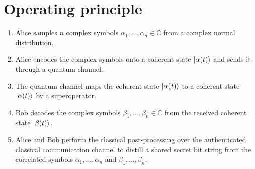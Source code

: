 \section{Operating principle}

\begin{enumerate}
	\item Alice samples $n$ complex symbols $\alpha_1,\dots,\alpha_n\in\mathbb{C}$ from a complex normal distribution.
	\item Alice encodes the complex symbols onto a coherent state $\ket{\alpha(t)}$ and sends it through a quantum channel.
	\item The quantum channel maps the coherent state $\ket{\alpha(t)}$ to a coherent state $\ket{\alpha(t)}$ by a superoperator.
	\item Bob decodes the complex symbols $\beta_1,\dots,\beta_n\in\mathbb{C}$ from the received coherent state $\ket{\beta(t)}$.
	\item Alice and Bob perform the classical post-processing over the authenticated classical communication channel to distill a shared secret bit string from the correlated symbols $\alpha_1,\dots,\alpha_n$ and $\beta_1,\dots,\beta_n$.
\end{enumerate}


